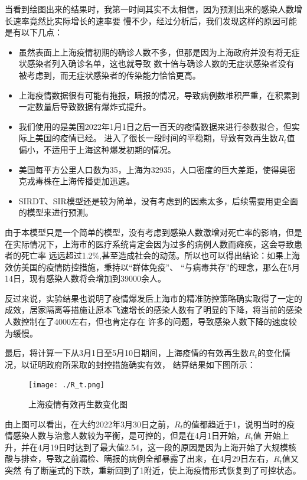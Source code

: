 \documentclass[bwprint]{gmcmthesis}
\numberwithin{figure}{section}
\begin{document}
\par 当看到绘图出来的结果时，我第一时间其实不太相信，因为预测出来的感染人数增长速率竟然比实际增长的速率要
慢不少，经过分析后，我们发现这样的原因可能是有以下几点：
\begin{itemize}
    \item 虽然表面上上海疫情初期的确诊人数不多，但那是因为上海政府并没有将无症状感染者列入确诊名单，这也就导致
数十倍与确诊人数的无症状感染者没有被考虑到，而无症状感染者的传染能力恰恰更高。
    \item 上海疫情数据很有可能有拖报，瞒报的情况，导致病例数堆积严重，在积累到一定数量后导致数据有爆炸式提升。
    \item 我们使用的是美国2022年1月1日之后一百天的疫情数据来进行参数拟合，但实际上美国的疫情已经。
进入了很长一段时间的平稳期，导致有效再生数$R_t$值偏小，不适用于上海这种爆发初期的情况。
    \item 美国每平方公里人口数为35，上海为32935，人口密度的巨大差距，使得奥密克戎毒株在上海传播更加迅速。
    \item SIRDT、SIR模型还是较为简单，没有考虑到的因素太多，后续需要用更全面的模型来进行预测。
\end{itemize}

\par 由于本模型只是一个简单的模型，没有考虑到感染人数激增对死亡率的影响，但是在实际情况下，上海市的医疗系统肯定会因为过多的病例人数而瘫痪，这会导致患者的死亡率
远远超过1.2$\%$,甚至造成社会的动荡。所以也可以得出结论：如果上海效仿美国的疫情防控措施，秉持以“群体免疫”、
“与病毒共存”的理念，那么在5月14日，现有感染人数将会增加到39000余人。
\par 反过来说，实验结果也说明了疫情爆发后上海市的精准防控策略确实取得了一定的成效，居家隔离等措施让原本飞速增长的感染人数有了明显的下降，将当前的感染人数控制在了4000左右，但也肯定存在
许多的问题，导致感染人数下降的速度较为缓慢。

\par 最后，将计算一下从3月1日至5月10日期间，上海疫情的有效再生数$R_t$的变化情况，以证明政府所采取的封控措施确实有效，
结算结果如下图所示：

\begin{figure}[!h]
    \centering
    \texttt{[image: ./R\_t.png]}
    \caption{上海疫情有效再生数变化图}
    \label{fig1}
\end{figure}

\par 由上图可以看出，在大约2022年3月30日之前，$R_t$的值都趋近于1，说明当时的疫情感染人数与治愈人数较为平衡，是可控的，但是在4月1日开始，$R_t$值
开始上升，并在4月19日时达到了最大值2.54，这一段的原因是因为上海开始了大规模核酸与排查，导致之前漏检、瞒报的病例全部暴露了出来，在4月29日左右，$R_t$值又突然
有了断崖式的下跌，重新回到了1附近，使上海疫情形式恢复到了可控状态。
\end{document}
